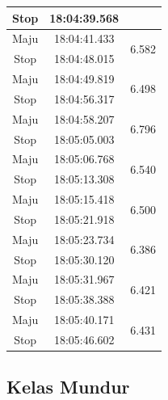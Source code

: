 \begin{longtable}{|c|c|c|}
  Stop           & 18:04:39.568        &                         \\ \hline
  Maju           & 18:04:41.433        & \multirow{2}{*}{6.582}  \\ \cline{1-2}
  Stop           & 18:04:48.015        &                         \\ \hline
  Maju           & 18:04:49.819        & \multirow{2}{*}{6.498}  \\ \cline{1-2}
  Stop           & 18:04:56.317        &                         \\ \hline
  Maju           & 18:04:58.207        & \multirow{2}{*}{6.796}  \\ \cline{1-2}
  Stop           & 18:05:05.003        &                         \\ \hline
  Maju           & 18:05:06.768        & \multirow{2}{*}{6.540}  \\ \cline{1-2}
  Stop           & 18:05:13.308        &                         \\ \hline
  Maju           & 18:05:15.418        & \multirow{2}{*}{6.500}  \\ \cline{1-2}
  Stop           & 18:05:21.918        &                         \\ \hline
  Maju           & 18:05:23.734        & \multirow{2}{*}{6.386}  \\ \cline{1-2}
  Stop           & 18:05:30.120        &                         \\ \hline
  Maju           & 18:05:31.967        & \multirow{2}{*}{6.421}  \\ \cline{1-2}
  Stop           & 18:05:38.388        &                         \\ \hline
  Maju           & 18:05:40.171        & \multirow{2}{*}{6.431}  \\ \cline{1-2}
  Stop           & 18:05:46.602        &                         \\ \hline
\end{longtable}

\subsection{Kelas Mundur}


